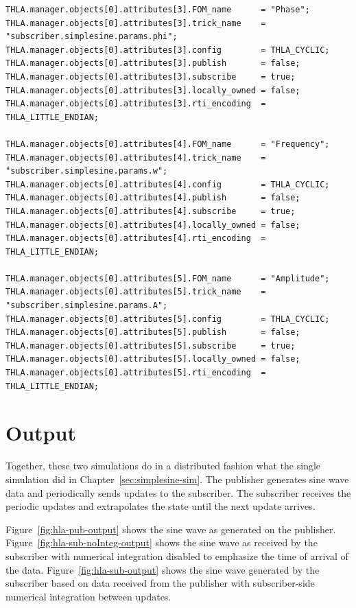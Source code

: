\begin{lstlisting}[caption={{\tt SIM\_simplesine\_hla\_sub} input file},label={list:hla-sub-input}]
THLA.manager.objects[0].attributes[3].FOM_name      = "Phase";
THLA.manager.objects[0].attributes[3].trick_name    = "subscriber.simplesine.params.phi";
THLA.manager.objects[0].attributes[3].config        = THLA_CYCLIC;
THLA.manager.objects[0].attributes[3].publish       = false;
THLA.manager.objects[0].attributes[3].subscribe     = true;
THLA.manager.objects[0].attributes[3].locally_owned = false;
THLA.manager.objects[0].attributes[3].rti_encoding  = THLA_LITTLE_ENDIAN;

THLA.manager.objects[0].attributes[4].FOM_name      = "Frequency";
THLA.manager.objects[0].attributes[4].trick_name    = "subscriber.simplesine.params.w";
THLA.manager.objects[0].attributes[4].config        = THLA_CYCLIC;
THLA.manager.objects[0].attributes[4].publish       = false;
THLA.manager.objects[0].attributes[4].subscribe     = true;
THLA.manager.objects[0].attributes[4].locally_owned = false;
THLA.manager.objects[0].attributes[4].rti_encoding  = THLA_LITTLE_ENDIAN;

THLA.manager.objects[0].attributes[5].FOM_name      = "Amplitude";
THLA.manager.objects[0].attributes[5].trick_name    = "subscriber.simplesine.params.A";
THLA.manager.objects[0].attributes[5].config        = THLA_CYCLIC;
THLA.manager.objects[0].attributes[5].publish       = false;
THLA.manager.objects[0].attributes[5].subscribe     = true;
THLA.manager.objects[0].attributes[5].locally_owned = false;
THLA.manager.objects[0].attributes[5].rti_encoding  = THLA_LITTLE_ENDIAN;
\end{lstlisting}


\section{Output}

Together, these two simulations do in a distributed fashion what
the single simulation did in Chapter~\ref{sec:simplesine-sim}.
The publisher generates sine wave data and periodically sends updates
to the subscriber.
The subscriber receives the periodic updates and extrapolates the state
until the next update arrives.

Figure~\ref{fig:hla-pub-output} shows the sine wave as generated on
the publisher.
Figure~\ref{fig:hla-sub-noInteg-output} shows the sine wave as received by
the subscriber with numerical integration disabled to emphasize the
time of arrival of the data.
Figure~\ref{fig:hla-sub-output} shows the sine wave generated by the
subscriber based on data received from the publisher with subscriber-side
numerical integration between updates.

